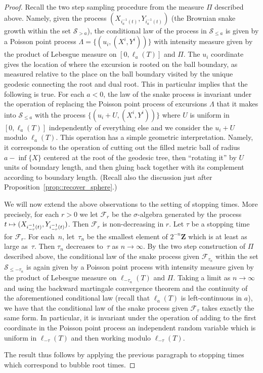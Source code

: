 \documentclass[JEP,XML,SOM,Unicode]{cedram}
\let\mathcal\mathscr
\newcommand\mto{\mathchoice{\longmapsto}{\mapsto}{\mapsto}{\mapsto}}
\theoremstyle{plain}
\numberwithin{theorem}{section}
\theoremstyle{definition}
\newcommand{\CF}{{\mathcal F}}
\newcommand{\snake}{{\mathcal S}}
\newcommand{\Z}{\mathbf{Z}}
\let\snakeexcursionmeasure \Pi
\begin{document}
\begin{proof}
Recall the two step sampling procedure from the measure $\snakeexcursionmeasure$ described above. Namely, given the process $(X_{i_a^{-1}(t)},Y_{i_a^{-1}(t)})$ (\ie the Brownian snake growth within the set $\snake_{>a}$), the conditional law of the process in $\snake_{\leq a}$ is given by a Poisson point process $\Lambda = \{ (u_i,(X^i,Y^i))\}$ with intensity measure given by the product of Lebesgue measure on $[0,\ell_a(T)]$ and $\snakeexcursionmeasure$. The $u_i$ coordinate gives the location of where the excursion is rooted on the ball boundary, as measured relative to the place on the ball boundary visited by the unique geodesic connecting the root and dual root. This in particular implies that the following is true. For each $a < 0$, the law of the snake process is invariant under the operation of replacing the Poisson point process of excursions $\Lambda$ that it makes into $\snake_{\leq a}$ with the process $\{ (u_i + U,(X^i,Y^i))\}$ where $U$ is uniform in $[0,\ell_a(T)]$ independently of everything else and we consider the $u_i + U$ modulo $\ell_a(T)$. This operation has a simple geometric interpretation. Namely, it corresponds to the operation of cutting out the filled metric ball of radius $a-\inf\{X\}$ centered at the root of the geodesic tree, then ``rotating it'' by $U$ units of boundary length, and then gluing back together with its complement according to boundary length. (Recall also the discussion just after Proposition~\ref{prop::recover_sphere}.)\enlargethispage{.5\baselineskip}

We will now extend the above observations to the setting of stopping times. More precisely, for each $r > 0$ we let $\CF_r$ be the $\sigma$-algebra generated by the process $t \mto (X_{i_{-r}^{-1}(t)},Y_{i_{-r}^{-1}(t)})$. Then $\CF_r$ is non-decreasing in $r$. Let $\tau$ be a stopping time for $\CF_r$. For each~$n$, let~$\tau_n$ be the smallest element of $2^{-n} \Z$ which is at least as large as~$\tau$. Then $\tau_n$ decreases to~$\tau$ as $n \to \infty$. By the two step construction of $\Pi$ described above, the conditional law of the snake process given $\CF_{\tau_n}$ within the set $\snake_{\leq -\tau_n}$ is again given by a Poisson point process with intensity measure given by the product of Lebesgue measure on $\ell_{-\tau_n}(T)$ and $\Pi$. Taking a limit as $n \to \infty$ and using the backward martingale convergence theorem and the continuity of the aforementioned conditional law (recall that $\ell_a(T)$ is left-continuous in $a$), we have that the conditional law of the snake process given $\CF_\tau$ takes exactly the same form. In particular, it is invariant under the operation of adding to the first coordinate in the Poisson point process an independent random variable which is uniform in $\ell_{-\tau}(T)$ and then working modulo $\ell_{-\tau}(T)$.

The result thus follows by applying the previous paragraph to stopping times which correspond to bubble root times.
\end{proof}
\end{document}
